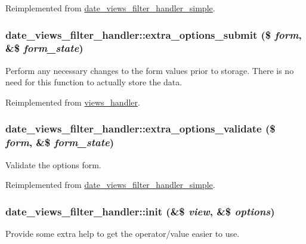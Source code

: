 Reimplemented from \hyperlink{classdate__views__filter__handler__simple_aec14000e6f8d47bbb7c3dd0138a10c59}{date\_\-views\_\-filter\_\-handler\_\-simple}.\hypertarget{classdate__views__filter__handler_af1326072f8c40f95d86d680d52bba8b4}{
\subsubsection[{extra\_\-options\_\-submit}]{\setlength{\rightskip}{0pt plus 5cm}date\_\-views\_\-filter\_\-handler::extra\_\-options\_\-submit (\$ {\em form}, \/  \&\$ {\em form\_\-state})}}
\label{classdate__views__filter__handler_af1326072f8c40f95d86d680d52bba8b4}
Perform any necessary changes to the form values prior to storage. There is no need for this function to actually store the data. 

Reimplemented from \hyperlink{classviews__handler_aca642bf4dff25e0d49f7fca65bb97f77}{views\_\-handler}.\hypertarget{classdate__views__filter__handler_af9d27a5bd6a2c0fe3c81327daf5ef45e}{
\subsubsection[{extra\_\-options\_\-validate}]{\setlength{\rightskip}{0pt plus 5cm}date\_\-views\_\-filter\_\-handler::extra\_\-options\_\-validate (\$ {\em form}, \/  \&\$ {\em form\_\-state})}}
\label{classdate__views__filter__handler_af9d27a5bd6a2c0fe3c81327daf5ef45e}
Validate the options form. 

Reimplemented from \hyperlink{classdate__views__filter__handler__simple_a3b294398f9130f76fbf3144bf2120a63}{date\_\-views\_\-filter\_\-handler\_\-simple}.\hypertarget{classdate__views__filter__handler_adaa0b2cd0664c75f987af0b79386a3b7}{
\subsubsection[{init}]{\setlength{\rightskip}{0pt plus 5cm}date\_\-views\_\-filter\_\-handler::init (\&\$ {\em view}, \/  \&\$ {\em options})}}
\label{classdate__views__filter__handler_adaa0b2cd0664c75f987af0b79386a3b7}
Provide some extra help to get the operator/value easier to use.

